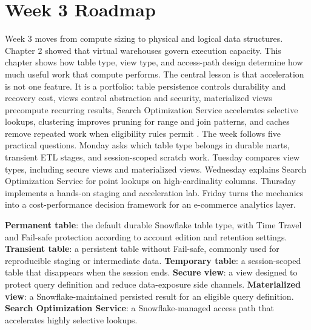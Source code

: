 \section{Week 3 Roadmap}
Week 3 moves from compute sizing to physical and logical data structures. Chapter 2 showed that virtual warehouses govern execution capacity. This chapter shows how table type, view type, and access-path design determine how much useful work that compute performs. The central lesson is that acceleration is not one feature. It is a portfolio: table persistence controls durability and recovery cost, views control abstraction and security, materialized views precompute recurring results, Search Optimization Service accelerates selective lookups, clustering improves pruning for range and join patterns, and caches remove repeated work when eligibility rules permit \cite{snowflakeTablesDocs,snowflakeViewsDocs,snowflakeMaterializedViewsDocs,snowflakeSearchOptimizationDocs}.
The week follows five practical questions. Monday asks which table type belongs in durable marts, transient ETL stages, and session-scoped scratch work. Tuesday compares view types, including secure views and materialized views. Wednesday explains Search Optimization Service for point lookups on high-cardinality columns. Thursday implements a hands-on staging and acceleration lab. Friday turns the mechanics into a cost-performance decision framework for an e-commerce analytics layer.
\begin{keyterms}
\textbf{Permanent table}: the default durable Snowflake table type, with Time Travel and Fail-safe protection according to account edition and retention settings.\quad
\textbf{Transient table}: a persistent table without Fail-safe, commonly used for reproducible staging or intermediate data.\quad
\textbf{Temporary table}: a session-scoped table that disappears when the session ends.\quad
\textbf{Secure view}: a view designed to protect query definition and reduce data-exposure side channels.\quad
\textbf{Materialized view}: a Snowflake-maintained persisted result for an eligible query definition.\quad
\textbf{Search Optimization Service}: a Snowflake-managed access path that accelerates highly selective lookups.
\end{keyterms}
